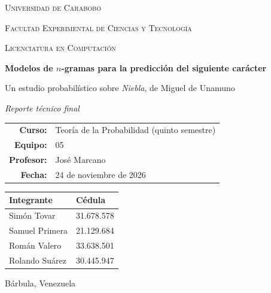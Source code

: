 \documentclass[11pt,letterpaper]{article}
\newcommand{\numeroequipo}{05}
\newcommand{\nombreA}{Simón Tovar}
\newcommand{\cedulaA}{31.678.578}
\newcommand{\nombreB}{Samuel Primera}
\newcommand{\cedulaB}{21.129.684}
\newcommand{\nombreC}{Román Valero}
\newcommand{\cedulaC}{33.638.501}
\newcommand{\nombreD}{Rolando Suárez}
\newcommand{\cedulaD}{30.445.947}
\newcommand{\nombreProfesor}{José Marcano}
\begin{document}
\begin{titlepage}
\centering
\thispagestyle{empty}

{\scshape\large Universidad de Carabobo\par}
\vspace{0.2cm}
{\scshape\large Facultad Experimental de Ciencias y Tecnología\par}
\vspace{0.2cm}
{\scshape Licenciatura en Computación\par}

\vspace{2.2cm}

{\Huge\bfseries Modelos de $n$-gramas para la predicción del siguiente carácter\par}
\vspace{0.7cm}
{\Large Un estudio probabilístico sobre \emph{Niebla}, de Miguel de Unamuno\par}

\vspace{0.6cm}
{\large\itshape Reporte técnico final\par}

\vspace{2.2cm}

\begin{tabular}{@{}rl@{}}
\textbf{Curso:} & Teoría de la Probabilidad (quinto semestre)\\[0.25em]
\textbf{Equipo:} & \numeroequipo\\[0.25em]
\textbf{Profesor:} & \nombreProfesor\\[0.25em]
\textbf{Fecha:} & 24 de noviembre de 2026\\
\end{tabular}

\vspace{1.4cm}

\begin{tabular}{@{}ll@{}}
\toprule
\textbf{Integrante} & \textbf{Cédula}\\
\midrule
\nombreA & \cedulaA\\
\nombreB & \cedulaB\\
\nombreC & \cedulaC\\
\nombreD & \cedulaD\\
\bottomrule
\end{tabular}

\vfill
{\large Bárbula, Venezuela\par}
\end{titlepage}
\end{document}
